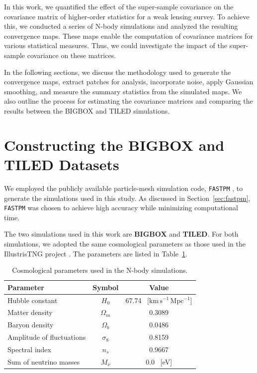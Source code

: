 
In this work, we quantified the effect of the super-sample covariance on the covariance matrix of higher-order statistics for a weak lensing survey. To achieve this, we conducted a series of N-body simulations and analyzed the resulting convergence maps. These maps enable the computation of covariance matrices for various statistical measures. Thus, we could investigate the impact of the super-sample covariance on these matrices.

In the following sections, we discuss the methodology used to generate the convergence maps, extract patches for analysis, incorporate noise, apply Gaussian smoothing, and measure the summary statistics from the simulated maps. We also outline the process for estimating the covariance matrices and comparing the results between the BIGBOX and TILED simulations.

\section{Constructing the BIGBOX and TILED Datasets}
We employed the publicly available particle-mesh simulation code, \texttt{FASTPM} \citep{10.1093/mnras/stw2123}, to generate the simulations used in this study. As discussed in Section~\ref{sec:fastpm}, \texttt{FASTPM} was chosen to achieve high accuracy while minimizing computational time.

The two simulations used in this work are \textbf{BIGBOX} and \textbf{TILED}. For both simulations, we adopted the same cosmological parameters as those used in the IllustrisTNG project \citep{2019ComAC...6....2N}. The parameters are listed in Table~\ref{tab:simulations}.

\begin{table}[h]
    \centering
    \begin{tabular}{lcc}
    \toprule
    \textbf{Parameter} & \textbf{Symbol} & \textbf{Value} \\
    \midrule
    Hubble constant & $H_0$ & 67.74 \, [$\mathrm{km\,s^{-1}\,Mpc^{-1}}$] \\ 
    Matter density & $\Omega_m$ & 0.3089 \\
    Baryon density & $\Omega_b$ & 0.0486 \\
    Amplitude of fluctuations & $\sigma_8$ & 0.8159 \\
    Spectral index & $n_s$ & 0.9667 \\
    Sum of neutrino masses & $M_{\nu}$ & 0.0 \, [eV] \\
    \bottomrule
    \end{tabular}
    \caption{Cosmological parameters used in the N-body simulations.}\label{tab:simulations}
\end{table}

